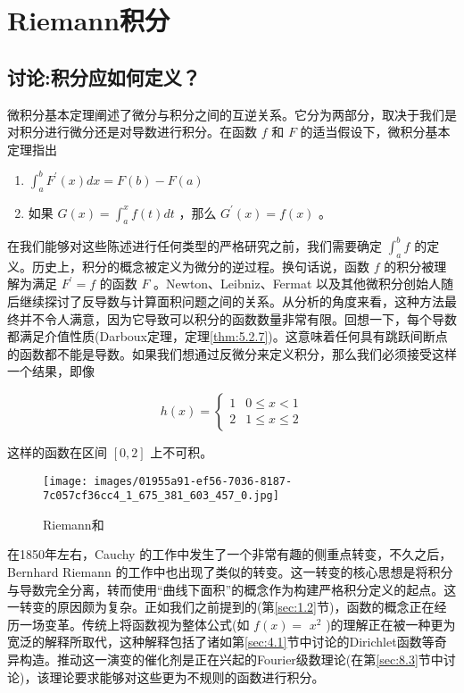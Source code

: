 \chapter{Riemann积分}
\label{chap:7}
\section{讨论:积分应如何定义？}
\label{sec:7.1}
微积分基本定理阐述了微分与积分之间的互逆关系。它分为两部分，取决于我们是对积分进行微分还是对导数进行积分。在函数 \(f\) 和 \(F\) 的适当假设下，微积分基本定理指出

\begin{enumerate}[label=(\roman*)]
\item\label{item:7.1.1} \({\int }_{a}^{b}{F}^{\prime }\left( x\right) {dx} = F\left( b\right)  - F\left( a\right)\) 
\item\label{item:7.1.2} 如果 \(G\left( x\right)  = {\int }_{a}^{x}f\left( t\right) {dt}\) ，那么 \({G}^{\prime }\left( x\right)  = f\left( x\right)\) 。
\end{enumerate}


在我们能够对这些陈述进行任何类型的严格研究之前，我们需要确定 \({\int }_{a}^{b}f\) 的定义。历史上，积分的概念被定义为微分的逆过程。换句话说，函数 \(f\) 的积分被理解为满足 \({F}^{\prime } = f\) 的函数 \(F\) 。Newton、Leibniz、Fermat 以及其他微积分创始人随后继续探讨了反导数与计算面积问题之间的关系。从分析的角度来看，这种方法最终并不令人满意，因为它导致可以积分的函数数量非常有限。回想一下，每个导数都满足介值性质(Darboux定理，定理\ref{thm:5.2.7})。这意味着任何具有跳跃间断点的函数都不能是导数。如果我们想通过反微分来定义积分，那么我们必须接受这样一个结果，即像

\[
h\left( x\right)  = \left\{  \begin{array}{ll} 1 & 0 \leq  x < 1 \\  2 & 1 \leq  x \leq  2 \end{array}\right.
\]

这样的函数在区间 \(\left\lbrack  {0,2}\right\rbrack\) 上不可积。

\begin{figure}[h]
  \centering
  \texttt{[image: images/01955a91-ef56-7036-8187-7c057cf36cc4\_1\_675\_381\_603\_457\_0.jpg]}
  \caption{Riemann和}
  \label{fig:7.1}
\end{figure}



在1850年左右，Cauchy 的工作中发生了一个非常有趣的侧重点转变，不久之后，Bernhard Riemann 的工作中也出现了类似的转变。这一转变的核心思想是将积分与导数完全分离，转而使用“曲线下面积”的概念作为构建严格积分定义的起点。这一转变的原因颇为复杂。正如我们之前提到的(第\ref{sec:1.2}节)，函数的概念正在经历一场变革。传统上将函数视为整体公式(如 \(f\left( x\right)  =\)  \({x}^{2}\) )的理解正在被一种更为宽泛的解释所取代，这种解释包括了诸如第\ref{sec:4.1}节中讨论的Dirichlet函数等奇异构造。推动这一演变的催化剂是正在兴起的Fourier级数理论(在第\ref{sec:8.3}节中讨论)，该理论要求能够对这些更为不规则的函数进行积分。


